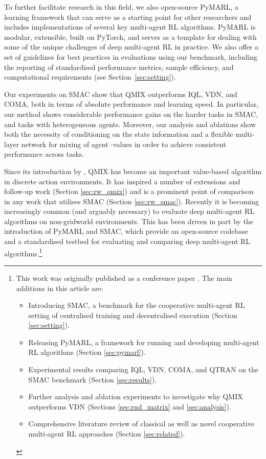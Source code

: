 \documentclass[twoside,11pt]{article}
\begin{document}
To further facilitate research in this field, we also open-source PyMARL,
a learning framework that can serve as a starting point for other researchers and includes implementations of several key multi-agent RL algorithms. PyMARL is modular, extensible, built on PyTorch, and serves as a template for dealing with some of the unique challenges of deep multi-agent RL in practice. 
We also offer a set of guidelines for best practices in evaluations using our benchmark, including the reporting of standardised performance metrics, sample efficiency, and computational requirements (see Section~\ref{sec:setting}).

Our experiments on SMAC show that QMIX outperforms IQL, VDN, and COMA, both in terms of absolute performance and learning speed.
In particular, our method shows considerable performance gains on the harder tasks in SMAC, and tasks with heterogeneous agents. 
Moreover, our analysis and ablations show both the necessity of 
conditioning on the state information and a flexible multi-layer network for mixing of agent 
-values in order to achieve consistent performance across tasks.

Since its introduction by \citet{rashid2018qmix}, QMIX has become an important value-based algorithm in discrete action environments. 
It has inspired a number of extensions and follow-up work (Section \ref{sec:rw_qmix}) and is a prominent point of comparison in any work that utilises SMAC (Section \ref{sec:rw_smac}). 
Recently it is 
becoming increasingly common (and arguably necessary) to evaluate deep multi-agent RL algorithms on non-gridworld environments.
This has been driven in part by the introduction of PyMARL and SMAC, which provide an open-source codebase and a standardised testbed for evaluating and comparing deep multi-agent RL algorithms.\footnote{
	This work was originally published as a conference paper \citep{rashid2018qmix}.
	The main additions in this article are:
	\begin{itemize}
		\item Introducing SMAC, a benchmark for the cooperative multi-agent RL setting of centralised training and decentralised execution (Section \ref{sec:setting}).
		\item Releasing PyMARL, a framework for running and developing multi-agent RL algorithms (Section \ref{sec:pymarl}).
		\item Experimental results comparing IQL, VDN, COMA, and QTRAN on the SMAC benchmark (Section \ref{sec:results}).
		\item Further analysis and ablation experiments to investigate why QMIX outperforms VDN (Sections \ref{sec:rnd_matrix} and \ref{sec:analysis}).
		\item Comprehensive literature review of classical as well as novel cooperative multi-agent RL approaches (Section \ref{sec:related}).
	\end{itemize}
}
\end{document}
